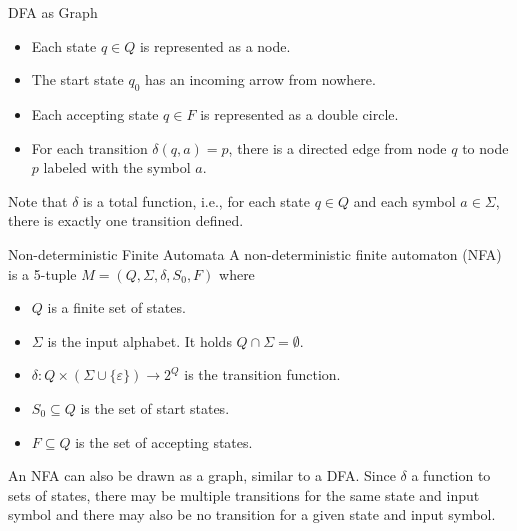 \documentclass{beamer}
\begin{document}
\begin{frame}{DFA as Graph}
    \begin{itemize}
        \item Each state $q\in Q$ is represented as a node.
        \item The start state $q_0$ has an incoming arrow from nowhere.
        \item Each accepting state $q\in F$ is represented as a double circle.
        \item For each transition $\delta(q,a)=p$, there is a directed edge from node $q$ to node $p$ labeled with the symbol $a$.
    \end{itemize}
    Note that $\delta$ is a total function, i.e., for each state $q\in Q$ and each symbol $a\in \Sigma$, there is exactly one transition defined.
\end{frame}


\begin{frame}{Non-deterministic Finite Automata}
    A non-deterministic finite automaton (NFA) is a 5-tuple $M=(Q,\Sigma,\delta,S_0,F)$ where
    \begin{itemize}
        \item $Q$ is a finite set of states.
        \item $\Sigma$ is the input alphabet. It holds $Q\cap \Sigma=\emptyset$.
        \item $\delta:Q\times (\Sigma\cup\{\varepsilon\})\to 2^Q$ is the transition function.
        \item $S_0\subseteq Q$ is the set of start states.
        \item $F\subseteq   Q$ is the set of accepting states.
    \end{itemize}
    An NFA can also be drawn as a graph, similar to a DFA. Since $\delta$ a function to sets of states, there may be multiple transitions for the same state and input symbol and there may also be no transition for a given state and input symbol.
\end{frame}
\end{document}
